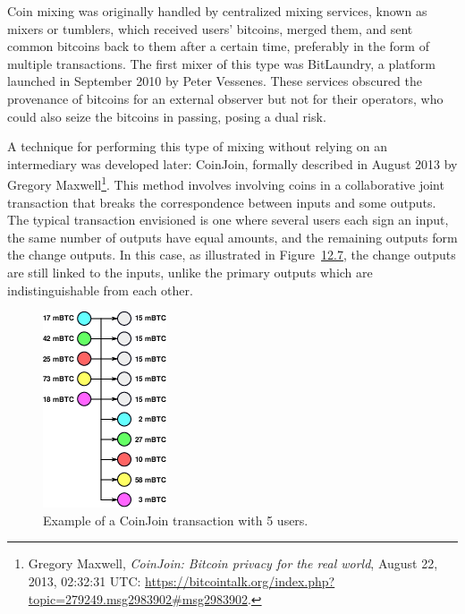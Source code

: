 \documentclass[
  a5paper,
  smalldemyvopaper,10pt,twoside,onecolumn,openright,extrafontsizes,hidelinks]{memoir}
\begin{document}
Coin mixing was originally handled by centralized mixing services, known
as mixers or tumblers, which received users' bitcoins, merged them, and
sent common bitcoins back to them after a certain time, preferably in
the form of multiple transactions. The first mixer of this type was
BitLaundry, a platform launched in September 2010 by Peter Vessenes.
These services obscured the provenance of bitcoins for an external
observer but not for their operators, who could also seize the bitcoins
in passing, posing a dual risk.

A technique for performing this type of mixing without relying on an
intermediary was developed later: CoinJoin, formally described in August
2013 by Gregory Maxwell\footnote{Gregory Maxwell, \emph{CoinJoin:
  Bitcoin privacy for the real world}, August 22, 2013, 02:32:31 UTC:
  \url{https://bitcointalk.org/index.php?topic=279249.msg2983902\#msg2983902}.}.
This method involves involving coins in a collaborative joint
transaction that breaks the correspondence between inputs and some
outputs. The typical transaction envisioned is one where several users
each sign an input, the same number of outputs have equal amounts, and
the remaining outputs form the change outputs. In this case, as
illustrated in Figure~\hyperref[fig:coinjoin-transaction]{12.7}, the
change outputs are still linked to the inputs, unlike the primary
outputs which are indistinguishable from each other.

\begin{figure}

{\centering \includegraphics{chapters/img/coinjoin-transaction-5i-10o.png}

}

\caption{Example of a CoinJoin transaction with 5 users.}

\end{figure}%
\end{document}
